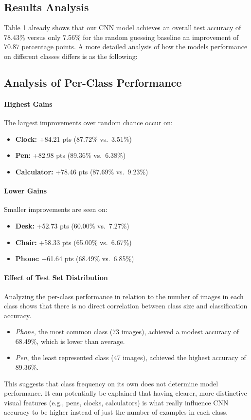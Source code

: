 \documentclass[10pt]{article}
\begin{document}
\subsection{Results Analysis}

Table 1 already shows that our CNN model achieves an overall test accuracy of 78.43\% versus only 7.56\% for the random guessing baseline an improvement of 
70.87 percentage points. A more detailed analysis of how the models performance on different classes differs is as the following:

\subsection{Analysis of Per-Class Performance}
\paragraph{Highest Gains}  
The largest improvements over random chance occur on:
\begin{itemize}
  \item \textbf{Clock:} +84.21 pts (87.72\% vs.\ 3.51\%)
  \item \textbf{Pen:}   +82.98 pts (89.36\% vs.\ 6.38\%)
  \item \textbf{Calculator:} +78.46 pts (87.69\% vs.\ 9.23\%)
\end{itemize}

\paragraph{Lower Gains}  
Smaller improvements are seen on:
\begin{itemize}
  \item \textbf{Desk:} +52.73 pts (60.00\% vs.\ 7.27\%)
  \item \textbf{Chair:} +58.33 pts (65.00\% vs.\ 6.67\%)
  \item \textbf{Phone:} +61.64 pts (68.49\% vs.\ 6.85\%)
\end{itemize}

\paragraph{Effect of Test Set Distribution}
Analyzing the per-class performance in relation to the number of images in each class shows that there is no direct correlation between class size and classification accuracy.
\begin{itemize}
  \item \emph{Phone}, the most common class (73 images), achieved a modest accuracy of 68.49\%, which is lower than average.
  \item \emph{Pen}, the least represented class (47 images), achieved the highest accuracy of 89.36\%.
\end{itemize}
This suggests that class frequency on its own does not determine model performance. It can potentially be explained that having clearer, more distinctive visual features (e.g., pens, clocks, calculators)
is what really influence CNN accuracy to be higher instead of just the number of examples in each class.
\end{document}
